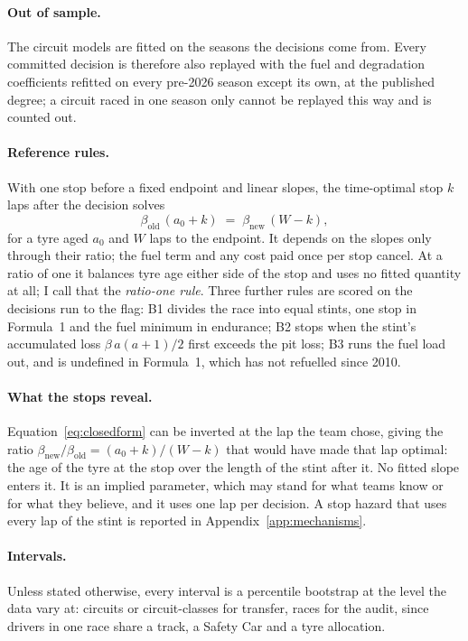\documentclass[11pt,a4paper]{article}
\begin{document}
\paragraph{Out of sample.} The circuit models are fitted on the seasons the
decisions come from. Every committed decision is therefore also replayed with
the fuel and degradation coefficients refitted on every pre-2026 season except
its own, at the published degree; a circuit raced in one season only cannot be
replayed this way and is counted out.

\paragraph{Reference rules.} With one stop before a fixed endpoint and linear
slopes, the time-optimal stop $k$ laps after the decision solves
%
\begin{equation}
\beta_{\mathrm{old}}\,(a_0 + k) \;=\; \beta_{\mathrm{new}}\,(W - k),
\label{eq:closedform}
\end{equation}
%
for a tyre aged $a_0$ and $W$ laps to the endpoint. It depends on the slopes
only through their ratio; the fuel term and any cost paid once per stop cancel.
At a ratio of one it balances tyre age either side of the stop and uses no
fitted quantity at all; I call that the \emph{ratio-one rule}. Three further
rules are scored on the decisions run to the flag: B1 divides the race into
equal stints, one stop in Formula~1 and the fuel minimum in endurance; B2 stops when the stint's accumulated loss
$\beta\,a(a+1)/2$ first exceeds the pit loss; B3 runs the fuel load out, and is
undefined in Formula~1, which has not refuelled since 2010.

\paragraph{What the stops reveal.} Equation~\ref{eq:closedform} can be
inverted at the lap the team chose, giving the ratio
$\beta_{\mathrm{new}}/\beta_{\mathrm{old}} = (a_0+k)/(W-k)$ that would have
made that lap optimal: the age of the tyre at the stop over the length of the
stint after it. No fitted slope enters it. It is an implied parameter, which
may stand for what teams know or for what they believe, and it uses one lap per
decision. A stop hazard that uses every lap of the stint is reported in
Appendix~\ref{app:mechanisms}.

\paragraph{Intervals.} Unless stated otherwise, every interval is a percentile bootstrap at the level the
data vary at: circuits or circuit-classes for transfer, races for the audit,
since drivers in one race share a track, a Safety Car and a tyre allocation.
\end{document}
